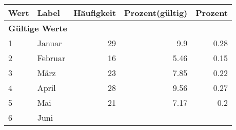      \begin{longtable}{lXrrr}
     \toprule
     \textbf{Wert} & \textbf{Label} & \textbf{Häufigkeit} & \textbf{Prozent(gültig)} & \textbf{Prozent} \\
     \endhead
     \midrule
     \multicolumn{5}{l}{\textbf{Gültige Werte}}\\

     1 &
     \multicolumn{1}{X}{ Januar   } &


       \num{29} &
       \num[round-mode=places,round-precision=2]{9.9} &
         \num[round-mode=places,round-precision=2]{0.28} \\

     2 &
     \multicolumn{1}{X}{ Februar   } &


       \num{16} &
       \num[round-mode=places,round-precision=2]{5.46} &
         \num[round-mode=places,round-precision=2]{0.15} \\

     3 &
     \multicolumn{1}{X}{ März   } &


       \num{23} &
       \num[round-mode=places,round-precision=2]{7.85} &
         \num[round-mode=places,round-precision=2]{0.22} \\

     4 &
     \multicolumn{1}{X}{ April   } &


       \num{28} &
       \num[round-mode=places,round-precision=2]{9.56} &
         \num[round-mode=places,round-precision=2]{0.27} \\

     5 &
     \multicolumn{1}{X}{ Mai   } &


       \num{21} &
       \num[round-mode=places,round-precision=2]{7.17} &
         \num[round-mode=places,round-precision=2]{0.2} \\

     6 &
     \multicolumn{1}{X}{ Juni   } &



\end{longtable}
